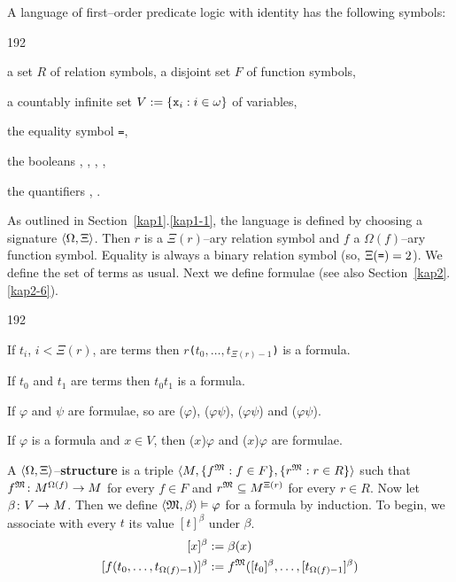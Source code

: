 A language of first--order predicate logic with identity
has the following symbols:
\begin{dingautolist}{192}
\item a set $R$ of relation symbols, a disjoint set $F$ of
    function symbols,
\item a countably infinite set $V := \{\mbox{\tt x}_i: i \in \omega\}$
    of variables,
\item the equality symbol {\tt =},
\item the booleans {\mtt{}}, {\mtt{}}, {\mtt{}}, 
	{\mtt{}}, 
\item the quantifiers {\mtt{}}, {\mtt{}}.
\end{dingautolist}
As outlined in Section~\ref{kap1}.\ref{kap1-1}, the language is defined
by choosing a signature $\langle \Omega, \Xi\rangle$. Then $r$ is a
$\Xi(r)$--ary relation symbol and $f$ a $\Omega(f)$--ary function
symbol. Equality is always a binary relation symbol (so,
$\Xi(\mbox{\tt =}) = 2$). We define the set of terms as usual.
Next we define formulae (see also Section~\ref{kap2}.\ref{kap2-6}).
\begin{dingautolist}{192}
\item If $t_i$, $i < \Xi(r)$, are terms then
    {\tt $r$($t_0, \dotsc, t_{\Xi(r)-1}$)} is a formula.
\item If $t_0$ and $t_1$ are terms then {\mtt $t_0$$t_1$}
    is a formula.
\item If $\varphi$ and $\psi$ are formulae, so are
    {\mtt ($\varphi$)}, {\mtt ($\varphi$$\psi$)},
    {\mtt ($\varphi$$\psi$)} and 
	{\mtt ($\varphi$$\psi$)}.
\item If $\varphi$ is a formula and $x \in V$, then
    {\mtt ($x$)$\varphi$} and 
    {\mtt ($x$)$\varphi$}
    are formulae.
\end{dingautolist}
A $\langle \Omega, \Xi\rangle$--{\bf structure} is a triple
$\langle M, \{f^{\mathfrak{M}} : f \in F\}, \{r^{\mathfrak{M}} : r \in R\}\rangle$
such that $f^{\mathfrak{M}} \colon M^{\Omega(f)} \rightarrow M$ for every $f \in F$
and $r^{\mathfrak{M}} \subseteq M^{\Xi(r)}$ for every $r \in R$. Now
let $\beta \colon V \rightarrow M$. Then we define $\langle \mathfrak{M}, \beta\rangle \vDash
\varphi$ for a formula by induction.  To begin, we associate with
every $t$ its value $[t]^{\beta}$ under $\beta$.
\begin{align}
\begin{split}
\mbox{}[x]^{\beta} & := \beta(x) \\
\mbox{}[f(t_0, \dotsc, t_{\Omega(f)-1})]^{\beta} &
    := f^{\mathfrak{M}}([t_0]^{\beta}, \dotsc, [t_{\Omega(f)-1}]^{\beta})
\end{split}
\end{align}
